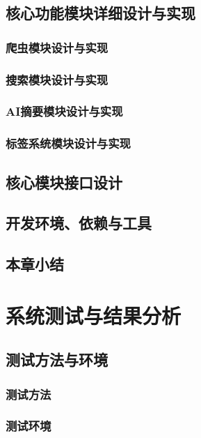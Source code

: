 \documentclass[a4paper,12pt]{ctexart}
\begin{document}
\subsection{核心功能模块详细设计与实现}

\subsubsection{爬虫模块设计与实现}

\subsubsection{搜索模块设计与实现}

\subsubsection{AI摘要模块设计与实现}

\subsubsection{标签系统模块设计与实现}

\subsection{核心模块接口设计}

\subsection{开发环境、依赖与工具}

\subsection{本章小结}

\section{系统测试与结果分析}

\subsection{测试方法与环境}

\subsubsection{测试方法}

\subsubsection{测试环境}
\end{document}
